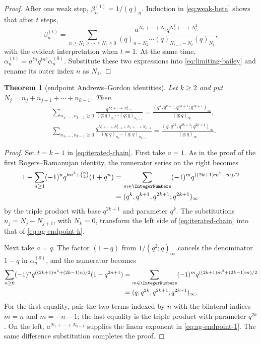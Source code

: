 \documentclass[11pt,oneside]{article}
\newtheorem{theorem}{Theorem}[section]
\theoremstyle{definition}
\begin{document}
\begin{proof}
After one weak step, $\beta_n^{(1)}=1/(q)_n$.  Induction in
\eqref{eq:weak-beta} shows that after $t$ steps,
\[
 \beta_n^{(t)}
 =
 \sum_{n\ge N_2\ge\cdots\ge N_t\ge0}
 \frac{a^{N_2+\cdots+N_t}q^{N_2^2+\cdots+N_t^2}}
 {(q)_{n-N_2}\cdots(q)_{N_{t-1}-N_t}(q)_{N_t}},
\]
with the evident interpretation when $t=1$.  At the same time,
$\alpha_n^{(t)}=a^{tn}q^{tn^2}\alpha_n^{(0)}$.  Substitute these two
expressions into \eqref{eq:limiting-bailey} and rename its outer index
$n$ as $N_1$.
\end{proof}

\begin{theorem}[endpoint Andrews--Gordon identities]
\label{thm:ag-endpoints}
Let $k\ge2$ and put $N_j=n_j+n_{j+1}+\cdots+n_{k-1}$.  Then
\begin{align}
&\sum_{n_1,\ldots,n_{k-1}\ge0}
 \frac{q^{N_1^2+\cdots+N_{k-1}^2}}
 {(q;q)_{n_1}\cdots(q;q)_{n_{k-1}}}
 =
 \frac{(q^k,q^{k+1},q^{2k+1};q^{2k+1})_\infty}
 {(q;q)_\infty},
 \label{eq:ag-endpoint-k}\\
&\sum_{n_1,\ldots,n_{k-1}\ge0}
 \frac{q^{N_1^2+\cdots+N_{k-1}^2+N_1+\cdots+N_{k-1}}}
 {(q;q)_{n_1}\cdots(q;q)_{n_{k-1}}}
 =
 \frac{(q,q^{2k},q^{2k+1};q^{2k+1})_\infty}
 {(q;q)_\infty}.
 \label{eq:ag-endpoint-1}
\end{align}
\end{theorem}

\begin{proof}
Set $t=k-1$ in \eqref{eq:iterated-chain}.  First take $a=1$.  As in the
proof of the first Rogers--Ramanujan identity, the numerator series on
the right becomes
\begin{align*}
 1+\sum_{n\ge1}(-1)^n
 q^{kn^2+\binom n2}(1+q^n)
 &=
 \sum_{m\in\IntegerNumbers}(-1)^m
 q^{((2k+1)m^2-m)/2}\\
 &=(q^k,q^{k+1},q^{2k+1};q^{2k+1})_\infty
\end{align*}
by the triple product with base $q^{2k+1}$ and parameter $q^k$.
The substitutions $n_j=N_j-N_{j+1}$, with $N_k=0$, transform the left
side of \eqref{eq:iterated-chain} into that of
\eqref{eq:ag-endpoint-k}.

Next take $a=q$.  The factor $(1-q)$ from
$1/(q^2;q)_\infty$ cancels the denominator $1-q$ in
$\alpha_n^{(0)}$, and the numerator becomes
\begin{align*}
 \sum_{n\ge0}(-1)^n
 q^{((2k+1)n^2+(2k-1)n)/2}(1-q^{2n+1})
 &=
 \sum_{m\in\IntegerNumbers}(-1)^m
 q^{((2k+1)m^2+(2k-1)m)/2}\\
 &=(q,q^{2k},q^{2k+1};q^{2k+1})_\infty.
\end{align*}
For the first equality, pair the two terms indexed by $n$ with the
bilateral indices $m=n$ and $m=-n-1$; the last equality is the triple
product with parameter $q^{2k}$.  On the left,
$a^{N_1+\cdots+N_{k-1}}$ supplies the linear exponent in
\eqref{eq:ag-endpoint-1}.  The same difference substitution completes
the proof.
\end{proof}
\end{document}
